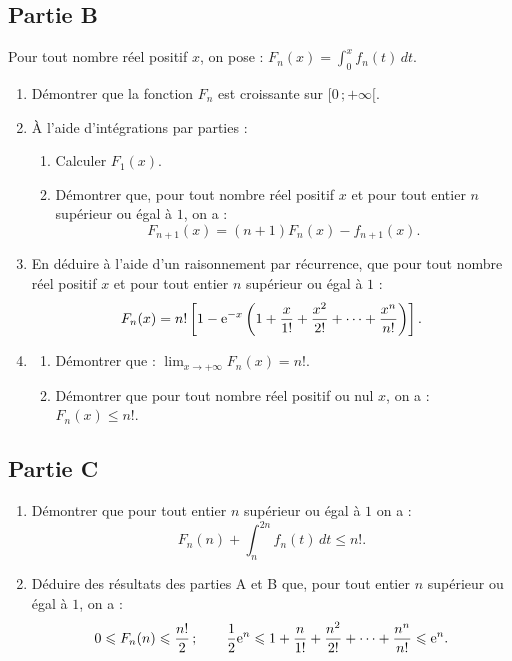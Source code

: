 \subsection*{Partie B}

Pour tout nombre réel positif $x$, on pose : $\displaystyle F_n(x)=\int_0^x f_n(t)\,dt$.

\begin{enumerate}
	\item Démontrer que la fonction $F_n$ est croissante sur $[0\,;+\infty[$.
	\item À l'aide d'intégrations par parties :
	\begin{enumerate}
		\item Calculer $F_1(x)$.
		\item Démontrer que, pour tout nombre réel positif $x$ et pour tout entier $n$ supérieur ou égal à $1$, on a :
		\[
		F_{n+1}(x) = (n+1)F_n(x) - f_{n+1}(x).
		\]
	\end{enumerate}
	\item En déduire à l'aide d'un raisonnement par récurrence, que pour tout nombre réel positif $x$ et pour tout entier $n$ supérieur ou égal à $1$ :
	\[
	F_n(x) = n!\left[1-\mathrm{e}^{-x}\left(1+\frac{x}{1!}+\frac{x^2}{2!}+\cdots+\frac{x^n}{n!}\right)\right].
	\]
	\item
	\begin{enumerate}
		\item Démontrer que : $\displaystyle\lim_{x\to+\infty} F_n(x) = n!$.
		\item Démontrer que pour tout nombre réel positif ou nul $x$, on a : $F_n(x)\leqslant n!$.
	\end{enumerate}
\end{enumerate}

\subsection*{Partie C}

\begin{enumerate}
	\item Démontrer que pour tout entier $n$ supérieur ou égal à $1$ on a :
	\[
	F_n(n) + \int_n^{2n} f_n(t)\,dt \leqslant n!.
	\]
	\item Déduire des résultats des parties A et B que, pour tout entier $n$ supérieur ou égal à $1$, on a :
	\[
	0 \leqslant F_n(n) \leqslant \frac{n!}{2}\,;
	\qquad
	\frac12\mathrm{e}^n \leqslant 1+\frac{n}{1!}+\frac{n^2}{2!}+\cdots+\frac{n^n}{n!} \leqslant \mathrm{e}^n.
	\]
\end{enumerate}


